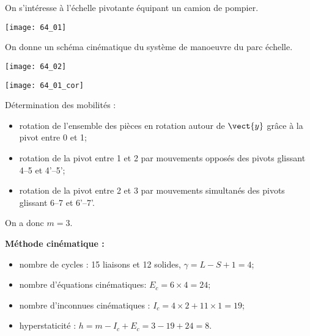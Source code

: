 \normaltrue \difficilefalse \tdifficilefalse
\correctiontrue

\setcounter{question}{0}


\ifcorrection
\else
{}
\fi

\ifprof
\else
On s'intéresse à l'échelle pivotante équipant un camion de pompier.


\begin{center}
\texttt{[image: 64\_01]}
\end{center}

On donne un schéma cinématique du système de manoeuvre du parc échelle.

\begin{center}
\texttt{[image: 64\_02]}
\end{center}

\fi

\ifprof

\begin{center}
\texttt{[image: 64\_01\_cor]}
\end{center}

\else 
\fi

\ifprof
Détermination des mobilités : 
\begin{itemize}
\item rotation de l'ensemble des pièces en rotation autour de $\vect{y}$ grâce à la pivot entre 0 et 1;
\item rotation de la pivot entre 1 et 2 par mouvements opposés des pivots glissant 4--5 et 4'--5';
\item rotation de la pivot entre 2 et 3 par mouvements simultanés des pivots glissant 6--7 et 6'--7'.
\end{itemize}
On a donc $m=3$. 

\textbf{Méthode cinématique : }
\begin{itemize}
\item nombre de cycles : 15 liaisons et 12 solides, $\gamma = L- S + 1 =4$;
\item nombre d'équations cinématiques: $E_c = 6\times 4 = 24$;
\item nombre d'inconnues cinématiques : $I_c = 4 \times 2+ 11 \times 1 = 19$;
\item hyperstaticité : $h=m-I_c + E_c = 3 -19 + 24 = 8$.
\end{itemize}


